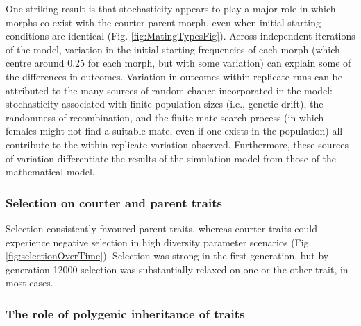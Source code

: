 \documentclass[
  11pt,
]{article}
\begin{document}
One striking result is that stochasticity appears to play a major role
in which morphs co-exist with the courter-parent morph, even when
initial starting conditions are identical (Fig.
\ref{fig:MatingTypesFig}). Across independent iterations of the model,
variation in the initial starting frequencies of each morph (which
centre around 0.25 for each morph, but with some variation) can explain
some of the differences in outcomes. Variation in outcomes within
replicate runs can be attributed to the many sources of random chance
incorporated in the model: stochasticity associated with finite
population sizes (i.e., genetic drift), the randomness of recombination,
and the finite mate search process (in which females might not find a
suitable mate, even if one exists in the population) all contribute to
the within-replicate variation observed. Furthermore, these sources of
variation differentiate the results of the simulation model from those
of the mathematical model.

\hypertarget{selection-on-courter-and-parent-traits}{%
\subsubsection{Selection on courter and parent traits}\label{selection-on-courter-and-parent-traits}}

Selection consistently favoured parent traits, whereas courter traits could experience negative selection in high diversity parameter scenarios (Fig. \ref{fig:selectionOverTime}). Selection was strong in the first generation, but by generation 12000 selection was substantially relaxed on one or the other trait, in most cases.

\hypertarget{the-role-of-polygenic-inheritance-of-traits}{%
\subsubsection{The role of polygenic inheritance of traits}\label{the-role-of-polygenic-inheritance-of-traits}}
\end{document}
